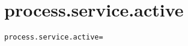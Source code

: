 \section{process.service.active}
\label{configuration:ProcessServiceActive}
\AvailableInCsharpOnly{\TODO}
\begin{lstlisting}[style=Props,caption={Usage example for \textit{process.service.active}}]
process.service.active=
\end{lstlisting}